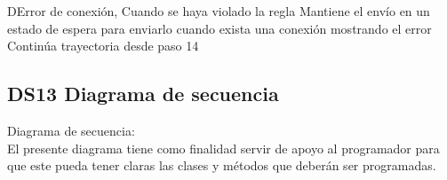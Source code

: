 \begin{UCtrayectoriaA}{D}{Error de conexión,
Cuando se haya violado la regla }
	\UCpaso Mantiene el envío en un estado de espera para enviarlo cuando exista una conexión mostrando el error 
	\UCpaso Continúa trayectoria desde paso 14 
\end{UCtrayectoriaA}



\newpage
\subsection{DS13 Diagrama de secuencia}
Diagrama de secuencia:
\\
El presente diagrama tiene como finalidad servir de apoyo al programador para que este pueda tener claras las clases y métodos que deberán ser programadas.
